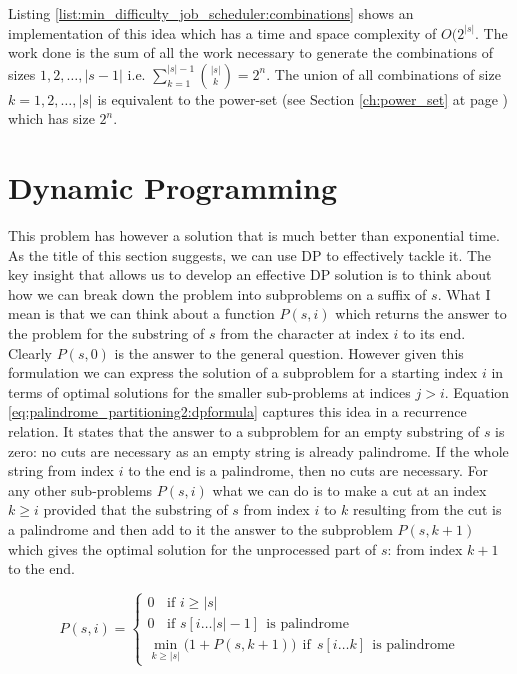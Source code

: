 Listing \ref{list:min_difficulty_job_scheduler:combinations} shows an implementation of this idea
which has a time and space complexity of $O(2^{|s|}$. The work done is the sum of all the work
necessary to generate the combinations of sizes $1,2,\ldots,|s-1|$ i.e. $\sum_{k=1}^{|s|-1} {|s|
\choose k} = 2^n$. The union of all combinations of size $k=1,2,\ldots,|s|$ is equivalent to the
power-set (see Section \ref{ch:power_set} at page \pageref{sec:powerset:discussion}) which has size
$2^n$.




\section{Dynamic Programming}
\label{sec:palindrome_partitioning2:DP}
This problem has however a solution that is much better than exponential time. As the title of this
section suggests, we can use DP to effectively tackle it. The key insight that allows us to develop
an effective DP solution is to think about how we can break down the problem into subproblems on a
suffix of $s$. What I mean is that we can think about a function $P(s, i)$ which returns the answer
to the problem for the substring of $s$ from the character at index $i$ to its end. Clearly $P(s,0)$
is the answer to the general question. However given this formulation  we can express the solution
of a subproblem for a starting index $i$ in terms of optimal solutions for the smaller sub-problems
at indices $j>i$. Equation \ref{eq:palindrome_partitioning2:dpformula} captures this idea in a
recurrence relation. It states that the answer to a subproblem for an empty substring of $s$ is
zero: no cuts are necessary as an empty string is already palindrome. If the whole string from index
$i$ to the end is a palindrome, then no cuts are necessary. For any other sub-problems $P(s,i)$ what
we can do is to make a cut at an index $k\geq i$ provided that  the  substring of $s$ from index $i$
to $k$ resulting from the cut is a palindrome and then add to it the answer to the subproblem
$P(s,k+1)$ which gives the optimal solution for the unprocessed part of $s$: from index $k+1$ to the
end.

\begin{equation}
	P(s, i) = \begin{cases}
		0 \; \; \text{ if } i \geq |s|  \\
		0 \; \; \text{ if } s[i\ldots |s|-1]  \:\: \text{is palindrome}  \\
		\min_{k\geq |s|} \big( 1 + P(s,k+1) \big) \: \: \text{if} \: \: s[i\ldots k]  \:\: \text{is palindrome}
	 \end{cases}
	\label{eq:palindrome_partitioning2:dpformula}
\end{equation}

